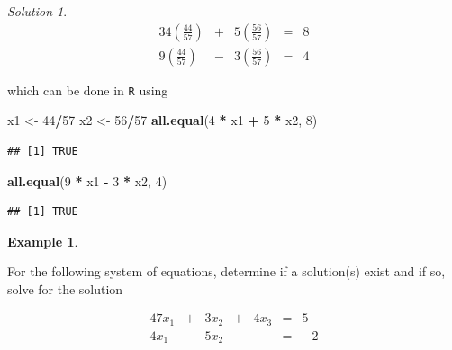 \documentclass[
]{book}
\newenvironment{Shaded}{\begin{snugshade}}{\end{snugshade}}
\newcommand{\DecValTok}[1]{\textcolor[rgb]{0.00,0.00,0.81}{#1}}
\newcommand{\KeywordTok}[1]{\textcolor[rgb]{0.13,0.29,0.53}{\textbf{#1}}}
\newcommand{\NormalTok}[1]{#1}
\newcommand{\OperatorTok}[1]{\textcolor[rgb]{0.81,0.36,0.00}{\textbf{#1}}}
\newcommand{\StringTok}[1]{\textcolor[rgb]{0.31,0.60,0.02}{#1}}
\theoremstyle{definition}
\theoremstyle{definition}
\newtheorem{example}{Example}[chapter]
\theoremstyle{definition}
\theoremstyle{remark}
\newtheorem*{solution}{Solution}
\begin{document}
\begin{solution}
\begin{alignat*}{3}
4 \left(\frac{44}{57}\right) & {}+{} & 5  \left(\frac{56}{57}\right) & {}={} & 8 \\
9 \left(\frac{44}{57}\right) & {}-{} & 3 \left(\frac{56}{57}\right)& {}={} & 4
\end{alignat*}

which can be done in \texttt{R} using

\begin{Shaded}
\begin{Highlighting}[]
\NormalTok{x1 <-}\StringTok{ }\DecValTok{44}\OperatorTok{/}\DecValTok{57}
\NormalTok{x2 <-}\StringTok{ }\DecValTok{56}\OperatorTok{/}\DecValTok{57}
\KeywordTok{all.equal}\NormalTok{(}\DecValTok{4} \OperatorTok{*}\StringTok{ }\NormalTok{x1 }\OperatorTok{+}\StringTok{ }\DecValTok{5} \OperatorTok{*}\StringTok{ }\NormalTok{x2, }\DecValTok{8}\NormalTok{)}
\end{Highlighting}
\end{Shaded}

\begin{verbatim}
## [1] TRUE
\end{verbatim}

\begin{Shaded}
\begin{Highlighting}[]
\KeywordTok{all.equal}\NormalTok{(}\DecValTok{9} \OperatorTok{*}\StringTok{ }\NormalTok{x1 }\OperatorTok{-}\StringTok{ }\DecValTok{3} \OperatorTok{*}\StringTok{ }\NormalTok{x2, }\DecValTok{4}\NormalTok{)}
\end{Highlighting}
\end{Shaded}

\begin{verbatim}
## [1] TRUE
\end{verbatim}

\end{solution}

\begin{example}
\protect\hypertarget{exm:unlabeled-div-51}{}\label{exm:unlabeled-div-51}

For the following system of equations, determine if a solution(s) exist and if so, solve for the solution

\begin{alignat*}{4}
7 x_1 & {}+{} & 3 x_2 & {}+{} & 4 x_3 & {}={} & 5\\
4 x_1 & {}-{} & 5 x_2 &&        & {}={} & -2
\end{alignat*}

\end{example}
\end{document}
